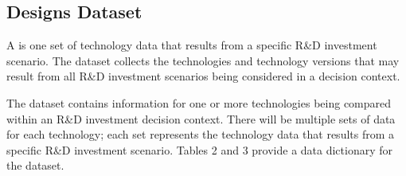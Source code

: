 \documentclass[letterpaper,10pt,english]{sphinxmanual}
\begin{document}
\subsection{Designs Dataset}
\label{\detokenize{cheat-sheet:designs-dataset}}
A  is one set of technology data that results from a specific R\&D investment scenario. The  dataset collects the technologies and technology versions that may result from all R\&D investment scenarios being considered in a decision context.

The  dataset contains information for one or more technologies being compared within an R\&D investment decision context. There will be multiple sets of data for each technology; each set represents the technology data that results from a specific R\&D investment scenario. Tables 2 and 3 provide a data dictionary for the  dataset.
\end{document}
